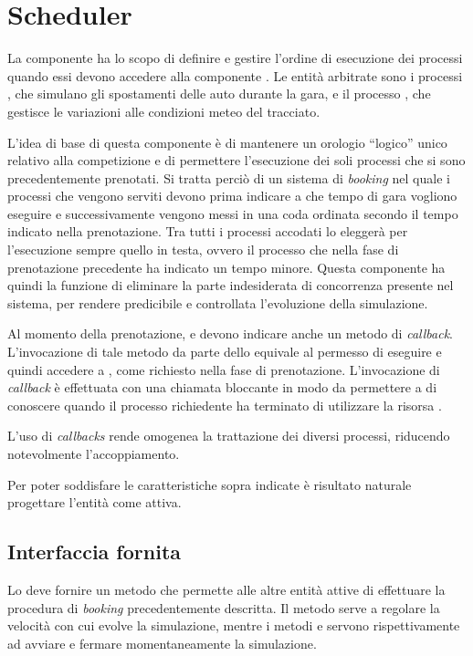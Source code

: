 \section{Scheduler}
\label{sec:scheduler}
La componente \sched{} ha lo scopo di definire e gestire l'ordine di esecuzione dei processi quando essi devono accedere alla componente \track{}.
Le entità arbitrate sono i processi \car{}, che simulano gli spostamenti delle auto durante la gara, e il processo \weather{}, che gestisce le variazioni alle condizioni meteo del tracciato.

L'idea di base di questa componente è di mantenere un orologio ``logico'' unico relativo alla competizione e di permettere l'esecuzione dei soli processi che si sono precedentemente prenotati. Si tratta perciò di un sistema di \textit{booking} nel quale i processi che vengono serviti devono prima indicare a che tempo di gara vogliono eseguire e successivamente vengono messi in una coda ordinata secondo il tempo indicato nella prenotazione. Tra tutti i processi accodati lo \sched{} eleggerà per l'esecuzione sempre quello in testa, ovvero il processo che nella fase di prenotazione precedente ha indicato un tempo minore. Questa componente ha quindi la funzione di eliminare la parte indesiderata di concorrenza presente nel sistema, per rendere predicibile e controllata l'evoluzione della simulazione.

Al momento della prenotazione, \car{} e \weather{} devono indicare anche un metodo di \textit{callback}. L'invocazione di tale metodo da parte dello \sched{} equivale al permesso di eseguire e quindi accedere a \track{}, come richiesto nella fase di prenotazione.
L'invocazione di \textit{callback} è effettuata con una chiamata bloccante in modo da permettere a \sched{} di conoscere quando il processo richiedente ha terminato di utilizzare la risorsa \track{}.

L'uso di \textit{callbacks} rende omogenea la trattazione dei diversi processi, riducendo notevolmente l'accoppiamento.

Per poter soddisfare le caratteristiche sopra indicate è risultato naturale progettare l'entità \sched{} come attiva.

\subsection*{Interfaccia fornita}
Lo \sched{} deve fornire un metodo  che permette alle altre entità attive di effettuare la procedura di \textit{booking} precedentemente descritta.
Il metodo  serve a regolare la velocità con cui evolve la simulazione, mentre i metodi  e  servono rispettivamente ad avviare e fermare momentaneamente la simulazione.


